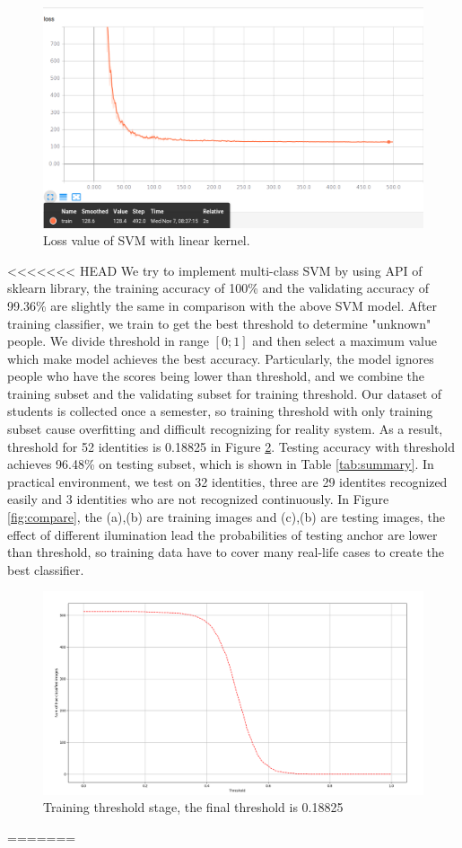 \documentclass[journal, twocolumn]{IEEEtran}
\begin{document}
\begin{figure}
    \centering
    \includegraphics[width=1\linewidth]{img/loss.png}
	\caption{Loss value of SVM with linear kernel.}
	\label{fig:loss}
\end{figure}
<<<<<<< HEAD
We try to implement multi-class SVM by using API of sklearn library, the training accuracy of 100\% and the validating accuracy of 99.36\% are slightly the same in comparison with the above SVM model. After training classifier, we train to get the best threshold to determine "unknown" people. We divide threshold in range $[0;1]$ and then select a maximum value which make model achieves the best accuracy. Particularly, the model ignores people who have the scores being lower than threshold, and we combine the training subset and the validating subset for training threshold. Our dataset of students is collected once a semester, so training threshold with only training subset cause overfitting and difficult recognizing for reality system. As a result, threshold for 52 identities is 0.18825 in Figure \ref{fig:thres}. Testing accuracy with threshold achieves 96.48\% on testing subset, which is shown in Table \ref{tab:summary}. In practical environment, we test on 32 identities, three are 29 identites recognized easily and 3 identities who are not recognized continuously. In Figure \ref{fig:compare}, the (a),(b) are training images and (c),(b) are testing images, the effect of different ilumination lead the probabilities of testing anchor are lower than threshold, so training data have to cover many real-life cases to create the best classifier.  
\begin{figure}
    \centering
    \includegraphics[width=1\linewidth]{img/thres.png}
	\caption{Training threshold stage, the final threshold is 0.18825}\label{fig:thres}
\end{figure}
=======
\end{document}
